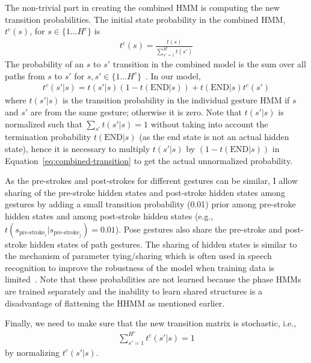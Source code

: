 The non-trivial part in creating the combined HMM is computing the new 
transition probabilities. The initial state probability in the combined
HMM, $t^c(s)$, for $s\in\{1\ldots H^c\}$ is
\begin{align*}
t^c(s) = \frac{t(s)}{\sum_{s'=1}^{H^c} t(s')}
\end{align*}
The probability of an $s$ to $s'$ transition
in the combined model is the sum over all paths from $s$ to
$s'$ for $s, s'\in\{1\ldots H^c\}$~\cite{murphy02}. In our model, 
\begin{align}
t^c(s'|s) = t(s' | s) (1-t(\text{END}|s)) +
t(\text{END}|s)t^c(s')
\label{eq:combined-transition}
\end{align}
where $t(s'|s)$ is the transition probability in the individual gesture HMM if
$s$ and $s'$ are from the same gesture; otherwise it is zero. Note that
$t(s'|s)$ is normalized such that $\sum_{s'}t(s'|s) = 1$ without taking into
account the termination probability $t(\text{END}|s)$ (as the end state is not
an actual hidden state), hence it is necessary to multiply $t(s'|s)$ by $
(1-t(\text{END}|s))$ in Equation~\ref{eq:combined-transition} to get the actual
unnormalized probability.

As the pre-strokes and post-strokes for different gestures can be similar, I
allow sharing of the pre-stroke hidden states and post-stroke hidden states
among gestures by adding a small transition probability (0.01) prior among
pre-stroke hidden states and among post-stroke hidden states (e.g.,
$t(s_{\text{pre-stroke}_i} | s_{\text{pre-stroke}_j}) = 0.01$).
Pose gestures also share the pre-stroke and post-stroke hidden states of path
gestures. The sharing of hidden states is similar to the mechanism of parameter
tying/sharing which is often used in speech recognition to improve the
robustness of the model when training data is limited~\cite{young1994}. Note
that these probabilities are not learned because the phase HMMs are trained
separately and the inability to learn shared structures is a disadvantage of
flattening the HHMM as mentioned earlier.

Finally, we need to make sure that the new transition matrix is stochastic,
i.e., 
\begin{align*}
\sum_{s' = 1}^{H^c} t^c(s'|s) = 1
\end{align*}
by normalizing $t^c(s'|s)$.

